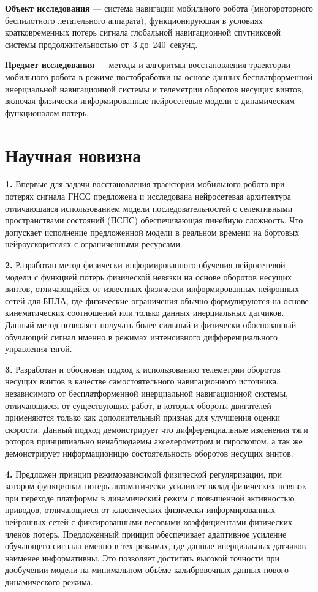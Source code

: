 \textbf{Объект исследования} --- система навигации мобильного робота (многороторного
беспилотного летательного аппарата), функционирующая в условиях кратковременных потерь
сигнала глобальной навигационной спутниковой системы продолжительностью от~3 до~240~секунд.

\textbf{Предмет исследования} --- методы и алгоритмы восстановления траектории мобильного
робота в режиме постобработки на основе данных бесплатформенной инерциальной навигационной
системы и телеметрии оборотов несущих винтов, включая физически информированные
нейросетевые модели с динамическим функционалом потерь.


\section{Научная новизна}

\textbf{1.} Впервые для задачи восстановления траектории мобильного робота при потерях сигнала ГНСС предложена и исследована нейросетевая архитектура отличающаяся использованием модели последовательностей с селективными пространствами состояний (ПСПС) обеспечивающая линейную сложность. Что допускает исполнение предложенной модели в реальном времени на бортовых нейроускорителях с ограниченными ресурсами. 

\textbf{2.} Разработан метод физически информированного обучения нейросетевой модели с функцией потерь физической невязки на основе оборотов несущих винтов, отличающийся от известных физически информированных нейронных сетей для БПЛА, где физические ограничения обычно формулируются на основе кинематических соотношений или только данных инерциальных датчиков. Данный метод позволяет получать более сильный и физически обоснованный обучающий сигнал именно в режимах интенсивного дифференциального управления тягой.

\textbf{3.} Разработан и обоснован подход к использованию телеметрии оборотов несущих винтов в качестве самостоятельного навигационного источника, независимого от бесплатформенной инерциальной навигационной системы, отличающиеся от существующих работ, в которых обороты двигателей применяются только как дополнительный признак для улучшения оценки скорости. Данный подход демонстрирует что дифференциальные изменения тяги роторов принципиально ненаблюдаемы акселерометром и гироскопом, а так же демонстрирует информационнцю состоятельность оборотов несущих винтов.

\textbf{4.} Предложен принцип режимозависимой физической регуляризации, при котором функционал потерь автоматически усиливает вклад физических невязок при переходе платформы в динамический режим с повышенной активностью приводов, отличающиеся от  классических физически информированных нейронных сетей с фиксированными весовыми коэффициентами физических членов потерь. Предложенный принцип обеспечивает адаптивное усиление обучающего сигнала именно в тех режимах, где данные инерциальных датчиков наименее информативны. Это позволяет достигать высокой точности при дообучении модели на минимальном объёме калибровочных данных нового динамического режима.

